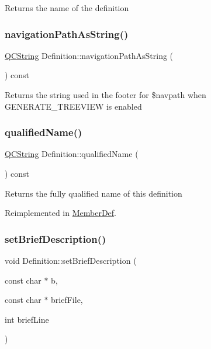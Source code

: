 Returns the name of the definition \mbox{\label{class_definition_abb9c001db23e5560b001814fa44934b9}} 
\subsubsection{\texorpdfstring{navigationPathAsString()}{navigationPathAsString()}}
{\footnotesize\ttfamily \mbox{\hyperlink{class_q_c_string}{Q\+C\+String}} Definition\+::navigation\+Path\+As\+String (\begin{DoxyParamCaption}{ }\end{DoxyParamCaption}) const}

Returns the string used in the footer for \$navpath when G\+E\+N\+E\+R\+A\+T\+E\+\_\+\+T\+R\+E\+E\+V\+I\+EW is enabled \mbox{\label{class_definition_a60354ebca3cb065a4a6aa1944a9309d5}} 
\subsubsection{\texorpdfstring{qualifiedName()}{qualifiedName()}}
{\footnotesize\ttfamily \mbox{\hyperlink{class_q_c_string}{Q\+C\+String}} Definition\+::qualified\+Name (\begin{DoxyParamCaption}{ }\end{DoxyParamCaption}) const\hspace{0.3cm}{\ttfamily [virtual]}}

Returns the fully qualified name of this definition 

Reimplemented in \mbox{\hyperlink{class_member_def_a910beace3eb5065c82c9c9f452532dfc}{Member\+Def}}.

\mbox{\label{class_definition_a5f6f7e25d740acb612b57365f9fccfc2}} 
\subsubsection{\texorpdfstring{setBriefDescription()}{setBriefDescription()}}
{\footnotesize\ttfamily void Definition\+::set\+Brief\+Description (\begin{DoxyParamCaption}\item[{const char $\ast$}]{b,  }\item[{const char $\ast$}]{brief\+File,  }\item[{int}]{brief\+Line }\end{DoxyParamCaption})\hspace{0.3cm}{\ttfamily [virtual]}}

